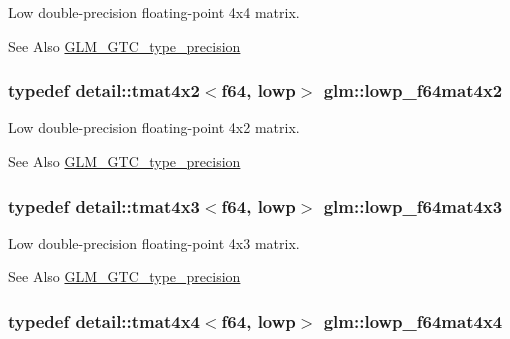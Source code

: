 Low double-\/precision floating-\/point 4x4 matrix. \begin{DoxySeeAlso}{See Also}
\hyperlink{group__gtc__type__precision}{G\-L\-M\-\_\-\-G\-T\-C\-\_\-type\-\_\-precision} 
\end{DoxySeeAlso}
\hypertarget{group__gtc__type__precision_ga37d10de43251a9a1be734bbb340ad2e7}{
\subsubsection[{lowp\-\_\-f64mat4x2}]{\setlength{\rightskip}{0pt plus 5cm}typedef detail\-::tmat4x2$<$f64, lowp$>$ {\bf glm\-::lowp\-\_\-f64mat4x2}}}\label{group__gtc__type__precision_ga37d10de43251a9a1be734bbb340ad2e7}
Low double-\/precision floating-\/point 4x2 matrix. \begin{DoxySeeAlso}{See Also}
\hyperlink{group__gtc__type__precision}{G\-L\-M\-\_\-\-G\-T\-C\-\_\-type\-\_\-precision} 
\end{DoxySeeAlso}
\hypertarget{group__gtc__type__precision_ga05dba0f9d45301c7b10a9276c60b8a0e}{
\subsubsection[{lowp\-\_\-f64mat4x3}]{\setlength{\rightskip}{0pt plus 5cm}typedef detail\-::tmat4x3$<$f64, lowp$>$ {\bf glm\-::lowp\-\_\-f64mat4x3}}}\label{group__gtc__type__precision_ga05dba0f9d45301c7b10a9276c60b8a0e}
Low double-\/precision floating-\/point 4x3 matrix. \begin{DoxySeeAlso}{See Also}
\hyperlink{group__gtc__type__precision}{G\-L\-M\-\_\-\-G\-T\-C\-\_\-type\-\_\-precision} 
\end{DoxySeeAlso}
\hypertarget{group__gtc__type__precision_gab7d0922ed8d93ee3ce995858feb41231}{
\subsubsection[{lowp\-\_\-f64mat4x4}]{\setlength{\rightskip}{0pt plus 5cm}typedef detail\-::tmat4x4$<$f64, lowp$>$ {\bf glm\-::lowp\-\_\-f64mat4x4}}}\label{group__gtc__type__precision_gab7d0922ed8d93ee3ce995858feb41231}
